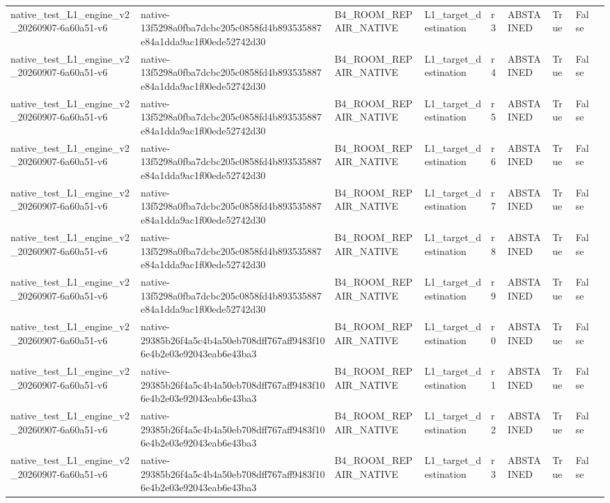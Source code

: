 \begin{tabular}{lllllllll}
native\_test\_L1\_engine\_v2\_20260907-6a60a51-v6 & native-13f5298a0fba7dcbc205c0858fd4b893535887e84a1dda9ac1f00ede52742d30 & B4\_ROOM\_REPAIR\_NATIVE & L1\_target\_destination & r3 & ABSTAINED & True & False &  \\
native\_test\_L1\_engine\_v2\_20260907-6a60a51-v6 & native-13f5298a0fba7dcbc205c0858fd4b893535887e84a1dda9ac1f00ede52742d30 & B4\_ROOM\_REPAIR\_NATIVE & L1\_target\_destination & r4 & ABSTAINED & True & False &  \\
native\_test\_L1\_engine\_v2\_20260907-6a60a51-v6 & native-13f5298a0fba7dcbc205c0858fd4b893535887e84a1dda9ac1f00ede52742d30 & B4\_ROOM\_REPAIR\_NATIVE & L1\_target\_destination & r5 & ABSTAINED & True & False &  \\
native\_test\_L1\_engine\_v2\_20260907-6a60a51-v6 & native-13f5298a0fba7dcbc205c0858fd4b893535887e84a1dda9ac1f00ede52742d30 & B4\_ROOM\_REPAIR\_NATIVE & L1\_target\_destination & r6 & ABSTAINED & True & False &  \\
native\_test\_L1\_engine\_v2\_20260907-6a60a51-v6 & native-13f5298a0fba7dcbc205c0858fd4b893535887e84a1dda9ac1f00ede52742d30 & B4\_ROOM\_REPAIR\_NATIVE & L1\_target\_destination & r7 & ABSTAINED & True & False &  \\
native\_test\_L1\_engine\_v2\_20260907-6a60a51-v6 & native-13f5298a0fba7dcbc205c0858fd4b893535887e84a1dda9ac1f00ede52742d30 & B4\_ROOM\_REPAIR\_NATIVE & L1\_target\_destination & r8 & ABSTAINED & True & False &  \\
native\_test\_L1\_engine\_v2\_20260907-6a60a51-v6 & native-13f5298a0fba7dcbc205c0858fd4b893535887e84a1dda9ac1f00ede52742d30 & B4\_ROOM\_REPAIR\_NATIVE & L1\_target\_destination & r9 & ABSTAINED & True & False &  \\
native\_test\_L1\_engine\_v2\_20260907-6a60a51-v6 & native-29385b26f4a5c4b4a50eb708dff767aff9483f106e4b2e03e92043eab6e43ba3 & B4\_ROOM\_REPAIR\_NATIVE & L1\_target\_destination & r0 & ABSTAINED & True & False &  \\
native\_test\_L1\_engine\_v2\_20260907-6a60a51-v6 & native-29385b26f4a5c4b4a50eb708dff767aff9483f106e4b2e03e92043eab6e43ba3 & B4\_ROOM\_REPAIR\_NATIVE & L1\_target\_destination & r1 & ABSTAINED & True & False &  \\
native\_test\_L1\_engine\_v2\_20260907-6a60a51-v6 & native-29385b26f4a5c4b4a50eb708dff767aff9483f106e4b2e03e92043eab6e43ba3 & B4\_ROOM\_REPAIR\_NATIVE & L1\_target\_destination & r2 & ABSTAINED & True & False &  \\
native\_test\_L1\_engine\_v2\_20260907-6a60a51-v6 & native-29385b26f4a5c4b4a50eb708dff767aff9483f106e4b2e03e92043eab6e43ba3 & B4\_ROOM\_REPAIR\_NATIVE & L1\_target\_destination & r3 & ABSTAINED & True & False &  \\

\end{tabular}

